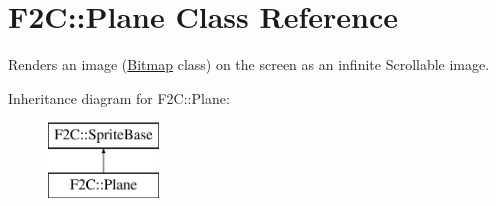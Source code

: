 \hypertarget{class_f2_c_1_1_plane}{
\section{F2C::Plane Class Reference}
\label{class_f2_c_1_1_plane}
}


Renders an image (\hyperlink{class_f2_c_1_1_bitmap}{Bitmap} class) on the screen as an infinite Scrollable image.  


Inheritance diagram for F2C::Plane:\begin{figure}[H]
\begin{center}
\leavevmode
\includegraphics[height=2.000000cm]{class_f2_c_1_1_plane}
\end{center}
\end{figure}
